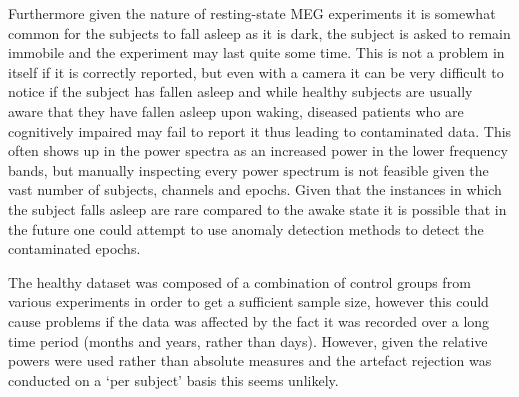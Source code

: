 Furthermore given the nature of resting-state MEG experiments it is somewhat common for the subjects to fall asleep as it is dark, the subject is asked to remain immobile and the experiment may last quite some time. This is not a problem in itself if it is correctly reported, but even with a camera it can be very difficult to notice if the subject has fallen asleep and while healthy subjects are usually aware that they have fallen asleep upon waking, diseased patients who are cognitively impaired may fail to report it thus leading to contaminated data. This often shows up in the power spectra as an increased power in the lower frequency bands, but manually inspecting every power spectrum is not feasible given the vast number of subjects, channels and epochs. Given that the instances in which the subject falls asleep are rare compared to the awake state it is possible that in the future one could attempt to use anomaly detection methods\cite{Chandola2009} to detect the contaminated epochs.

The healthy dataset was composed of a combination of control groups from various experiments in order to get a sufficient sample size, however this could cause problems if the data was affected by the fact it was recorded over a long time period (months and years, rather than days). However, given the relative powers were used rather than absolute measures and the artefact rejection was conducted on a `per subject' basis this seems unlikely.



